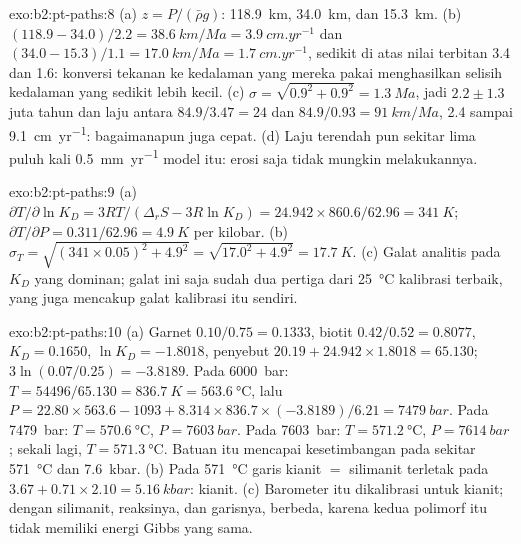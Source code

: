 \begin{solution}{exo:b2:pt-paths:8}
(a) $z = P/(\bar\rho g)$: \qty{118.9}{km}, \qty{34.0}{km}, dan \qty{15.3}{km}.
(b) $(118.9 - 34.0)/2.2 = \qty{38.6}{km/Ma} = \qty{3.9}{cm.yr^{-1}}$ dan $(34.0 -
15.3)/1.1 = \qty{17.0}{km/Ma} = \qty{1.7}{cm.yr^{-1}}$, sedikit di atas nilai terbitan
3.4 dan 1.6: konversi tekanan ke kedalaman yang mereka pakai menghasilkan selisih kedalaman yang sedikit
lebih kecil. (c) $\sigma = \sqrt{0.9^2 + 0.9^2} = \qty{1.3}{Ma}$, jadi $2.2 \pm 1.3$
juta tahun dan laju antara $84.9/3.47 = 24$ dan $84.9/0.93 = \qty{91}{km/Ma}$,
2.4 sampai \qty{9.1}{cm.yr^{-1}}: bagaimanapun juga cepat. (d) Laju terendah pun sekitar lima puluh kali
\qty{0.5}{mm.yr^{-1}} model itu: erosi saja tidak mungkin melakukannya.
\end{solution}

\begin{solution}{exo:b2:pt-paths:9}
(a) $\partial T/\partial\ln K_D = 3RT/(\Delta_r S - 3R\ln K_D) = 24.942\times860.6/62.96 =
\qty{341}{K}$; $\partial T/\partial P = 0.311/62.96 = \qty{4.9}{K}$ per kilobar.
(b) $\sigma_T = \sqrt{(341\times0.05)^2 + 4.9^2} = \sqrt{17.0^2 + 4.9^2} =
\qty{17.7}{K}$. (c) Galat analitis pada $K_D$ yang dominan; galat ini saja sudah dua pertiga
dari \qty{25}{\celsius} kalibrasi terbaik, yang juga mencakup galat
kalibrasi itu sendiri.
\end{solution}

\begin{solution}{exo:b2:pt-paths:10}
(a) Garnet $0.10/0.75 = 0.1333$, biotit $0.42/0.52 = 0.8077$, $K_D = 0.1650$, $\ln K_D =
-1.8018$, penyebut $20.19 + 24.942\times1.8018 = 65.130$; $3\ln(0.07/0.25) = -3.8189$.
Pada \qty{6000}{bar}: $T = 54496/65.130 = \qty{836.7}{K} = \qty{563.6}{\celsius}$, lalu $P
= 22.80\times563.6 - 1093 + 8.314\times836.7\times(-3.8189)/6.21 = \qty{7479}{bar}$.
Pada \qty{7479}{bar}: $T = \qty{570.6}{\celsius}$, $P = \qty{7603}{bar}$. Pada
\qty{7603}{bar}: $T = \qty{571.2}{\celsius}$, $P = \qty{7614}{bar}$; sekali lagi, $T =
\qty{571.3}{\celsius}$. Batuan itu mencapai kesetimbangan pada sekitar \qty{571}{\celsius} dan
\qty{7.6}{kbar}. (b) Pada \qty{571}{\celsius} garis kianit $=$ silimanit terletak pada $3.67
+ 0.71\times2.10 = \qty{5.16}{kbar}$: kianit. (c) Barometer itu dikalibrasi untuk
kianit; dengan silimanit, reaksinya, dan garisnya, berbeda, karena kedua polimorf itu tidak
memiliki energi Gibbs yang sama.
\end{solution}

